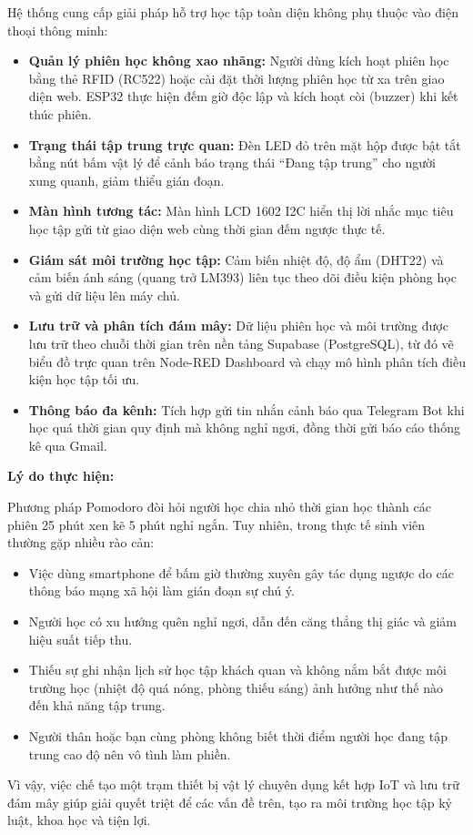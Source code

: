 Hệ thống cung cấp giải pháp hỗ trợ học tập toàn diện không phụ thuộc vào điện thoại thông minh:
\begin{itemize}
    \item \textbf{Quản lý phiên học không xao nhãng:} Người dùng kích hoạt phiên học bằng thẻ RFID (RC522) hoặc cài đặt thời lượng phiên học từ xa trên giao diện web. ESP32 thực hiện đếm giờ độc lập và kích hoạt còi (buzzer) khi kết thúc phiên.
    \item \textbf{Trạng thái tập trung trực quan:} Đèn LED đỏ trên mặt hộp được bật tắt bằng nút bấm vật lý để cảnh báo trạng thái ``Đang tập trung'' cho người xung quanh, giảm thiểu gián đoạn.
    \item \textbf{Màn hình tương tác:} Màn hình LCD 1602 I2C hiển thị lời nhắc mục tiêu học tập gửi từ giao diện web cùng thời gian đếm ngược thực tế.
    \item \textbf{Giám sát môi trường học tập:} Cảm biến nhiệt độ, độ ẩm (DHT22) và cảm biến ánh sáng (quang trở LM393) liên tục theo dõi điều kiện phòng học và gửi dữ liệu lên máy chủ.
    \item \textbf{Lưu trữ và phân tích đám mây:} Dữ liệu phiên học và môi trường được lưu trữ theo chuỗi thời gian trên nền tảng Supabase (PostgreSQL), từ đó vẽ biểu đồ trực quan trên Node-RED Dashboard và chạy mô hình phân tích điều kiện học tập tối ưu.
    \item \textbf{Thông báo đa kênh:} Tích hợp gửi tin nhắn cảnh báo qua Telegram Bot khi học quá thời gian quy định mà không nghỉ ngơi, đồng thời gửi báo cáo thống kê qua Gmail.
\end{itemize}

\vspace{0.2cm}
\textbf{Lý do thực hiện:}

Phương pháp Pomodoro đòi hỏi người học chia nhỏ thời gian học thành các phiên 25 phút xen kẽ 5 phút nghỉ ngắn. Tuy nhiên, trong thực tế sinh viên thường gặp nhiều rào cản:
\begin{itemize}
    \item Việc dùng smartphone để bấm giờ thường xuyên gây tác dụng ngược do các thông báo mạng xã hội làm gián đoạn sự chú ý.
    \item Người học có xu hướng quên nghỉ ngơi, dẫn đến căng thẳng thị giác và giảm hiệu suất tiếp thu.
    \item Thiếu sự ghi nhận lịch sử học tập khách quan và không nắm bắt được môi trường học (nhiệt độ quá nóng, phòng thiếu sáng) ảnh hưởng như thế nào đến khả năng tập trung.
    \item Người thân hoặc bạn cùng phòng không biết thời điểm người học đang tập trung cao độ nên vô tình làm phiền.
\end{itemize}
Vì vậy, việc chế tạo một trạm thiết bị vật lý chuyên dụng kết hợp IoT và lưu trữ đám mây giúp giải quyết triệt để các vấn đề trên, tạo ra môi trường học tập kỷ luật, khoa học và tiện lợi.

